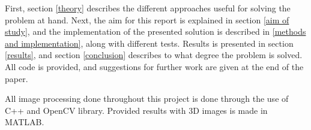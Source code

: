 First, section \ref{theory} describes the different approaches useful for solving the problem at hand. Next, the aim for this report is explained in section \ref{aim of study}, and the implementation of the presented solution is described in \ref{methods and implementation}, along with different tests. Results is presented in section \ref{results}, and section \ref{conclusion} describes to what degree the problem is solved. All code is provided, and suggestions for further work are given at the end of the paper.

All image processing done throughout this project is done through the use of C++ and OpenCV library. Provided results with 3D images is made in MATLAB.



